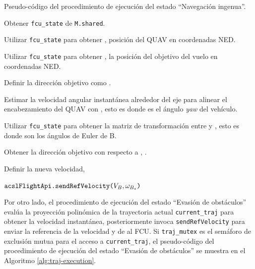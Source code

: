 \begin{algorithm}
\caption{Pseudo-código del procedimiento de ejecución del estado ``Navegación ingenua''. }
\label{alg:naive-execution}

Obtener \texttt{fcu\_state} de \texttt{M.shared}.

Utilizar \texttt{fcu\_state} para obtener , posición del QUAV en coordenadas NED.

Utilizar \texttt{fcu\_state} para obtener , la posición del objetivo del vuelo en coordenadas NED.

Definir la dirección objetivo como .

Estimar la velocidad angular instantánea alrededor del eje  para alinear el encabezamiento del QUAV con , esto es  donde \jim{\psi} es el ángulo \textit{yaw} del vehículo.

Utilizar \texttt{fcu\_state} para obtener la matriz de transformación entre  y , esto es  donde \jim{\phi,\theta,\psi} son los ángulos de Euler de B. 

Obtener la dirección objetivo con respecto a , .

Definir la nueva velocidad, 

$\text{\texttt{acslFlightApi.sendRefVelocity(}}V_{B}, \omega_{B_z}\text{\texttt{)}}$

\end{algorithm}

\pagebreak

Por otro lado, el procedimiento de ejecución del estado ``Evasión de obstáculos'' evalúa la proyección polinómica de la trayectoria actual \texttt{current\_traj} para obtener la velocidad instantánea, posteriormente invoca \texttt{sendRefVelocity} para enviar la referencia de la velocidad y de  al FCU. Si \texttt{traj\_mutex} es el semáforo de exclusión mutua para el acceso a \texttt{current\_traj}, el pseudo-código del procedimiento de ejecución del estado ``Evasión de obstáculos'' se muestra en el Algoritmo \ref{alg:traj-execution}.

